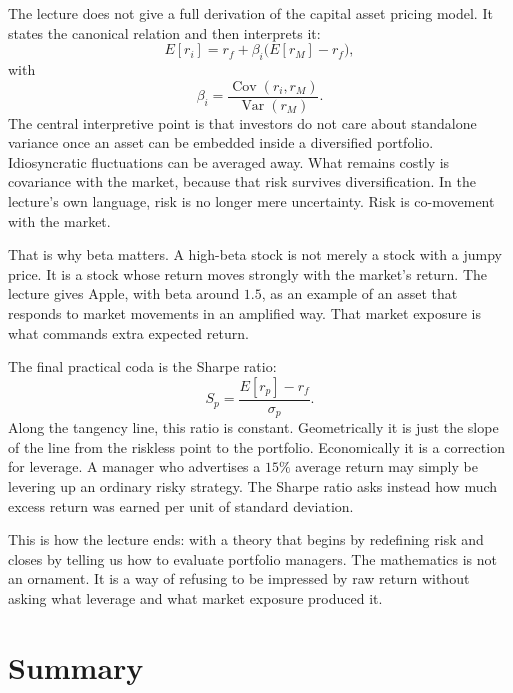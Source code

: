 The lecture does not give a full derivation of the capital asset pricing model. It states the canonical relation and then interprets it:
\begin{equation}
E[r_i] = r_f + \beta_i\bigl(E[r_M]-r_f\bigr),
\end{equation}
with
\begin{equation}
\beta_i = \frac{\operatorname{Cov}(r_i,r_M)}{\operatorname{Var}(r_M)}.
\end{equation}
The central interpretive point is that investors do not care about standalone variance once an asset can be embedded inside a diversified portfolio. Idiosyncratic fluctuations can be averaged away. What remains costly is covariance with the market, because that risk survives diversification. In the lecture's own language, risk is no longer mere uncertainty. Risk is co-movement with the market.

That is why beta matters. A high-beta stock is not merely a stock with a jumpy price. It is a stock whose return moves strongly with the market's return. The lecture gives Apple, with beta around \(1.5\), as an example of an asset that responds to market movements in an amplified way. That market exposure is what commands extra expected return.

The final practical coda is the Sharpe ratio:
\begin{equation}
S_p = \frac{E[r_p]-r_f}{\sigma_p}.
\end{equation}
Along the tangency line, this ratio is constant. Geometrically it is just the slope of the line from the riskless point to the portfolio. Economically it is a correction for leverage. A manager who advertises a \(15\%\) average return may simply be levering up an ordinary risky strategy. The Sharpe ratio asks instead how much excess return was earned per unit of standard deviation.

This is how the lecture ends: with a theory that begins by redefining risk and closes by telling us how to evaluate portfolio managers. The mathematics is not an ornament. It is a way of refusing to be impressed by raw return without asking what leverage and what market exposure produced it.

\section{Summary}

